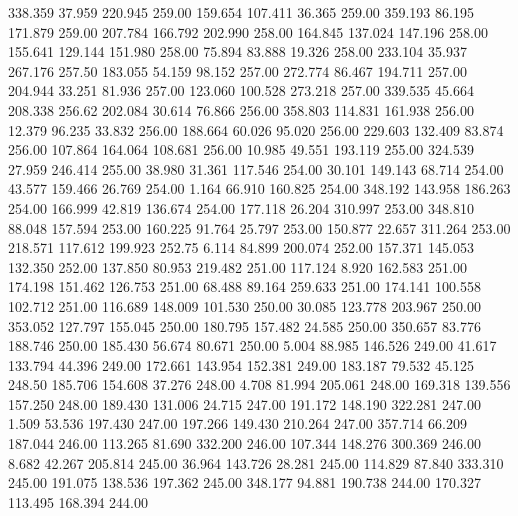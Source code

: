  338.359   37.959  220.945       259.00
 159.654  107.411   36.365       259.00
 359.193   86.195  171.879       259.00
 207.784  166.792  202.990       258.00
 164.845  137.024  147.196       258.00
 155.641  129.144  151.980       258.00
  75.894   83.888   19.326       258.00
 233.104   35.937  267.176       257.50
 183.055   54.159   98.152       257.00
 272.774   86.467  194.711       257.00
 204.944   33.251   81.936       257.00
 123.060  100.528  273.218       257.00
 339.535   45.664  208.338       256.62
 202.084   30.614   76.866       256.00
 358.803  114.831  161.938       256.00
  12.379   96.235   33.832       256.00
 188.664   60.026   95.020       256.00
 229.603  132.409   83.874       256.00
 107.864  164.064  108.681       256.00
  10.985   49.551  193.119       255.00
 324.539   27.959  246.414       255.00
  38.980   31.361  117.546       254.00
  30.101  149.143   68.714       254.00
  43.577  159.466   26.769       254.00
   1.164   66.910  160.825       254.00
 348.192  143.958  186.263       254.00
 166.999   42.819  136.674       254.00
 177.118   26.204  310.997       253.00
 348.810   88.048  157.594       253.00
 160.225   91.764   25.797       253.00
 150.877   22.657  311.264       253.00
 218.571  117.612  199.923       252.75
   6.114   84.899  200.074       252.00
 157.371  145.053  132.350       252.00
 137.850   80.953  219.482       251.00
 117.124    8.920  162.583       251.00
 174.198  151.462  126.753       251.00
  68.488   89.164  259.633       251.00
 174.141  100.558  102.712       251.00
 116.689  148.009  101.530       250.00
  30.085  123.778  203.967       250.00
 353.052  127.797  155.045       250.00
 180.795  157.482   24.585       250.00
 350.657   83.776  188.746       250.00
 185.430   56.674   80.671       250.00
   5.004   88.985  146.526       249.00
  41.617  133.794   44.396       249.00
 172.661  143.954  152.381       249.00
 183.187   79.532   45.125       248.50
 185.706  154.608   37.276       248.00
   4.708   81.994  205.061       248.00
 169.318  139.556  157.250       248.00
 189.430  131.006   24.715       247.00
 191.172  148.190  322.281       247.00
   1.509   53.536  197.430       247.00
 197.266  149.430  210.264       247.00
 357.714   66.209  187.044       246.00
 113.265   81.690  332.200       246.00
 107.344  148.276  300.369       246.00
   8.682   42.267  205.814       245.00
  36.964  143.726   28.281       245.00
 114.829   87.840  333.310       245.00
 191.075  138.536  197.362       245.00
 348.177   94.881  190.738       244.00
 170.327  113.495  168.394       244.00
